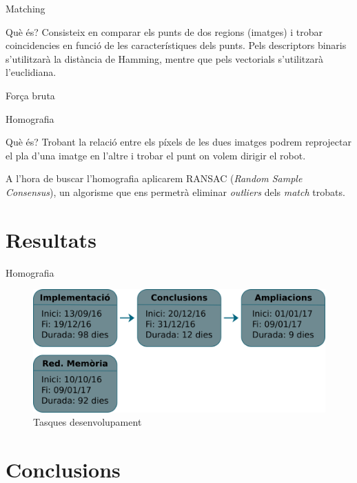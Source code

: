 \documentclass[xcolor=table, 11pt]{beamer}
\newcommand\tz{\fontsize{13}{15.6}\selectfont}
\begin{document}
	\begin{frame}{Matching}
		\tz
		\begin{block}{Què és?}
			Consisteix en comparar els punts de dos regions (imatges) i trobar coincidencies en funció de les característiques dels punts. Pels descriptors binaris s'utilitzarà la distància de Hamming,
			mentre que pels vectorials s'utilitzarà l'euclidiana.
		\end{block}
		Força bruta
	\end{frame}

	\begin{frame}{Homografia}
		\tz
		\begin{block}{Què és?}
			Trobant la relació entre els píxels de les dues imatges podrem reprojectar el pla d'una imatge en l'altre i trobar el punt on volem dirigir el robot.
		\end{block}
		A l'hora de buscar l'homografia aplicarem RANSAC (\textit{Random Sample Consensus})\cite{Fischler:1981:RSC:358669.358692},
		un algorisme que ens permetrà eliminar \textit{outliers} dels \textit{match} trobats.
	\end{frame}

\section{Resultats}

	\begin{frame}{Homografia}
		\tz
		\centering
		\begin{figure}
			\includegraphics[width=\textwidth-1cm]{tasques}
			\vspace{0.2cm}
			\caption{Tasques desenvolupament}
		\end{figure}
	\end{frame}


\section{Conclusions}
\end{document}
